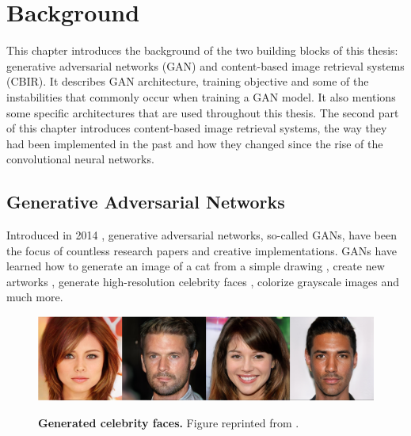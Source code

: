 \documentclass[12pt]{report}
\begin{document}

\newpage
\chapter{Background}
This chapter introduces the background of the two building blocks of this thesis: generative adversarial networks (GAN) and content-based image retrieval systems (CBIR). It describes GAN architecture, training objective and some of the instabilities that commonly occur when training a GAN model. It also mentions some specific architectures that are used throughout this thesis. The second part of this chapter introduces content-based image retrieval systems, the way they had been implemented in the past and how they changed since the rise of the convolutional neural networks.

\section{Generative Adversarial Networks}

Introduced in 2014 \cite{goodfellow_generative_2014}, generative adversarial  networks, so-called GANs, have been the focus of countless research papers and creative implementations. GANs have learned how to generate an image of a cat from a simple drawing \cite{hesse_image--image_nodate}, create new artworks \cite{rkjones4_gangogh_2018}, generate high-resolution celebrity faces \cite{karras_progressive_2017}, colorize grayscale images and much more.

\begin{figure}[b]
\centering
{\includegraphics[width=\linewidth]{02_background/gan_faces}}
\caption{\label{fig:mnist} \textbf{Generated celebrity faces.} Figure reprinted from \cite{karras_progressive_2017}.}
\end{figure}
\end{document}
